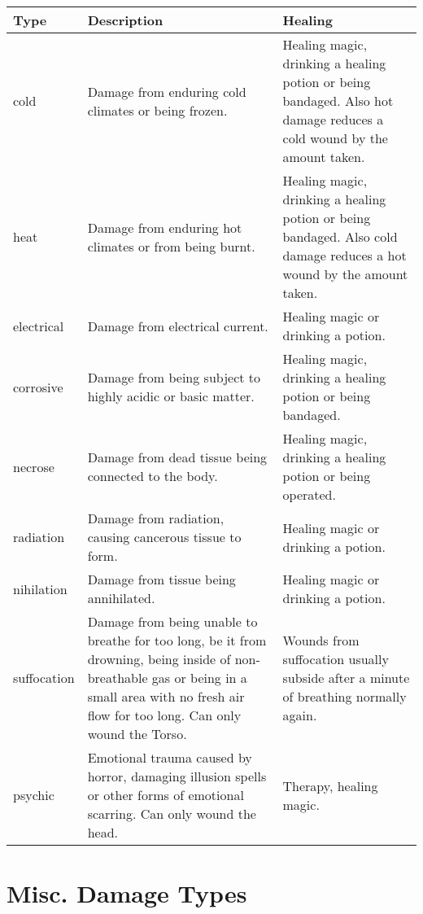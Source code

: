 \begin{longtable}{l p{5cm} p{5cm}}
Type & Description & Healing \\ \hline
cold & Damage from enduring cold climates or being frozen. & Healing magic, drinking a healing potion or being bandaged. Also hot damage reduces a cold wound by the amount taken. \\
heat & Damage from enduring hot climates or from being burnt. & Healing magic, drinking a healing potion or being bandaged. Also cold damage reduces a hot wound by the amount taken. \\
electrical & Damage from electrical current. & Healing magic or drinking a potion. \\
corrosive & Damage from being subject to highly acidic or basic matter. & Healing magic, drinking a healing potion or being bandaged. \\
necrose & Damage from dead tissue being connected to the body. & Healing magic, drinking a healing potion or being operated. \\
radiation & Damage from radiation, causing cancerous tissue to form. & Healing magic or drinking a potion. \\
nihilation & Damage from tissue being annihilated. & Healing magic or drinking a potion. \\
suffocation & Damage from being unable to breathe for too long, be it from drowning, being inside of non-breathable gas or being in a small area with no fresh air flow for too long. Can only wound the Torso. & Wounds from suffocation usually subside after a minute of breathing normally again. \\
psychic & Emotional trauma caused by horror, damaging illusion spells or other forms of emotional scarring. Can only wound the head. & Therapy, healing magic. \\
\end{longtable}

\section{Misc. Damage Types}\label{damagetypes:misc}

